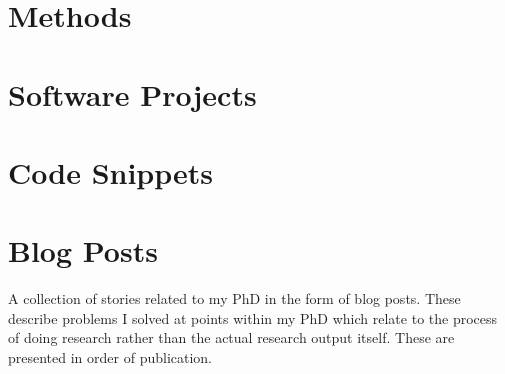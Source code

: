 \documentclass[12pt, a4paper]{report}
\begin{document}
\chapter{Methods} \label{sec:Methods}







{
  \sloppy
  \printbibliography[title={Literature Cited}]{}
}

\begin{appendices}
  \chapter{Software Projects} \label{sec:software_projects}
  
  \chapter{Code Snippets} \label{sec:code_snippets}
  
  \chapter{Blog Posts} \label{sec:blog_posts}
  A collection of stories related to my PhD in the form of blog posts.
  These describe problems I solved at points within my PhD
  which relate to the process of doing research
  rather than the actual research output itself.
  These are presented in order of publication.

  
  
  
  
  
  
  
  
  

\end{appendices}
\end{document}
